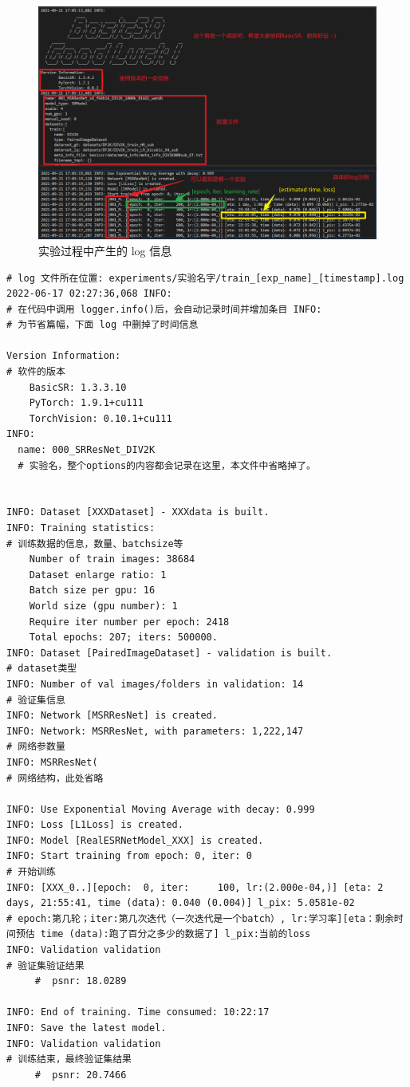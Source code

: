 \documentclass[../main.tex]{subfiles}
\begin{document}
\begin{figure}[H]
    \begin{center}
        \includegraphics[width=0.7\linewidth]{figures/getting_start_6.png}
        \caption{实验过程中产生的 log 信息}
        \label{fig:getting_start_6}
    \end{center}
    \vspace{-0.5cm}
\end{figure}

\begin{verbatim}
# log 文件所在位置: experiments/实验名字/train_[exp_name]_[timestamp].log
2022-06-17 02:27:36,068 INFO:
# 在代码中调用 logger.info()后，会自动记录时间并增加条目 INFO:
# 为节省篇幅，下面 log 中删掉了时间信息

Version Information:
# 软件的版本
    BasicSR: 1.3.3.10
    PyTorch: 1.9.1+cu111
    TorchVision: 0.10.1+cu111
INFO:
  name: 000_SRResNet_DIV2K
  # 实验名，整个options的内容都会记录在这里，本文件中省略掉了。


INFO: Dataset [XXXDataset] - XXXdata is built.
INFO: Training statistics:
# 训练数据的信息，数量、batchsize等
    Number of train images: 38684
    Dataset enlarge ratio: 1
    Batch size per gpu: 16
    World size (gpu number): 1
    Require iter number per epoch: 2418
    Total epochs: 207; iters: 500000.
INFO: Dataset [PairedImageDataset] - validation is built.
# dataset类型
INFO: Number of val images/folders in validation: 14
# 验证集信息
INFO: Network [MSRResNet] is created.
INFO: Network: MSRResNet, with parameters: 1,222,147
# 网络参数量
INFO: MSRResNet(
# 网络结构，此处省略

INFO: Use Exponential Moving Average with decay: 0.999
INFO: Loss [L1Loss] is created.
INFO: Model [RealESRNetModel_XXX] is created.
INFO: Start training from epoch: 0, iter: 0
# 开始训练
INFO: [XXX_0..][epoch:  0, iter:     100, lr:(2.000e-04,)] [eta: 2 days, 21:55:41, time (data): 0.040 (0.004)] l_pix: 5.0581e-02
# epoch:第几轮；iter:第几次迭代（一次迭代是一个batch）, lr:学习率][eta：剩余时间预估 time (data):跑了百分之多少的数据了] l_pix:当前的loss
INFO: Validation validation
# 验证集验证结果
     #  psnr: 18.0289

INFO: End of training. Time consumed: 10:22:17
INFO: Save the latest model.
INFO: Validation validation
# 训练结束，最终验证集结果
     #  psnr: 20.7466

\end{verbatim}
\end{document}
